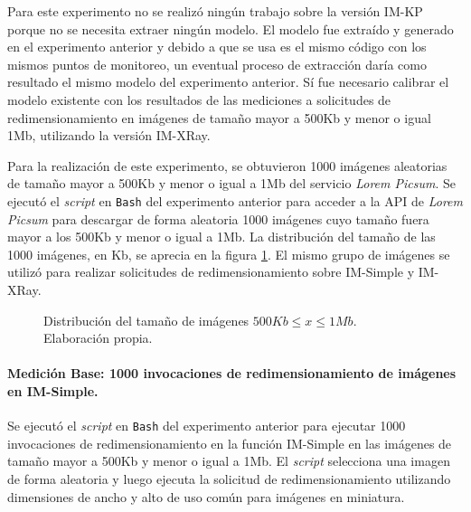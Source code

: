 Para este experimento no se realizó ningún trabajo sobre la versión IM-KP porque no se necesita extraer ningún modelo. El modelo fue extraído y generado en el experimento anterior y debido a que se usa es el mismo código con los mismos puntos de monitoreo, un eventual proceso de extracción daría como resultado el mismo modelo del experimento anterior. Sí fue necesario calibrar el modelo existente con los resultados de las mediciones a solicitudes de redimensionamiento en imágenes de tamaño mayor a 500Kb y menor o igual 1Mb, utilizando la versión IM-XRay.

Para la realización de este experimento, se obtuvieron 1000 imágenes aleatorias de tamaño mayor a 500Kb y menor o igual a 1Mb del servicio \emph{Lorem Picsum}. Se ejecutó el \emph{script} en \texttt{Bash} del experimento anterior para acceder a la API de \emph{Lorem Picsum} para descargar de forma aleatoria 1000 imágenes cuyo tamaño fuera mayor a los 500Kb y menor o igual a 1Mb. La distribución del tamaño de las 1000 imágenes, en Kb, se aprecia en la figura \ref{fig:distribucion-tamanno-imagenes-hasta-1mb}. El mismo grupo de imágenes se utilizó para realizar solicitudes de redimensionamiento sobre IM-Simple y IM-XRay.

\begin{figure}[h]
\hspace{-1.0cm}
\caption[Distribución del tamaño de imágenes $500Kb \leq x \leq 1Mb$]{Distribución del tamaño de imágenes $500Kb \leq x \leq 1Mb$. Elaboración propia.}
\label{fig:distribucion-tamanno-imagenes-hasta-1mb}
\end{figure}

\paragraph{Medición Base: 1000 invocaciones de redimensionamiento de imágenes en IM-Simple.} 
Se ejecutó el \emph{script} en \texttt{Bash} del experimento anterior para ejecutar 1000 invocaciones de redimensionamiento en la función IM-Simple en las imágenes de tamaño mayor a 500Kb y menor o igual a 1Mb. El \emph{script} selecciona una imagen de forma aleatoria y luego ejecuta la solicitud de redimensionamiento utilizando dimensiones de ancho y alto de uso común para imágenes en miniatura.

